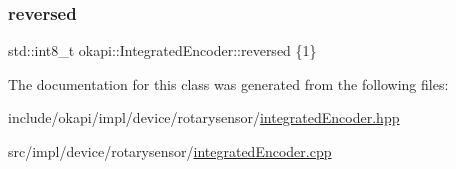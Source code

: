 \mbox{\label{classokapi_1_1IntegratedEncoder_a7a354457ac0f976c9aab65c73070c0ee}} 
\subsubsection{\texorpdfstring{reversed}{reversed}}
{\footnotesize\ttfamily std\+::int8\+\_\+t okapi\+::\+Integrated\+Encoder\+::reversed \{1\}\hspace{0.3cm}{\ttfamily [protected]}}



The documentation for this class was generated from the following files\+:\begin{DoxyCompactItemize}
\item 
include/okapi/impl/device/rotarysensor/\mbox{\hyperlink{integratedEncoder_8hpp}{integrated\+Encoder.\+hpp}}\item 
src/impl/device/rotarysensor/\mbox{\hyperlink{integratedEncoder_8cpp}{integrated\+Encoder.\+cpp}}\end{DoxyCompactItemize}
